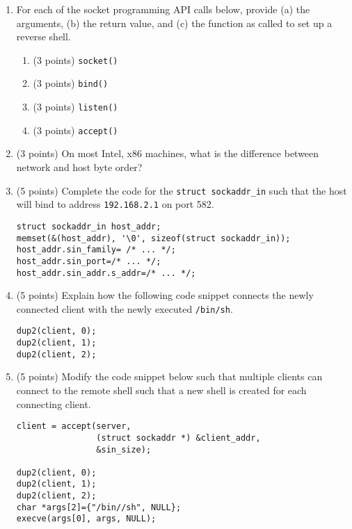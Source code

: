 \documentclass{article}[9pt]
\begin{document}
\begin{enumerate}
\item For each of the socket programming API calls below, provide (a)
the arguments, (b) the return value, and (c) the function as
called to set up a reverse shell.

\begin{enumerate}
\item (3 points) \texttt{socket()}

\item (3 points) \texttt{bind()}

\item (3 points) \texttt{listen()}

\item (3 points) \texttt{accept()}
\end{enumerate}

\item (3 points) On most Intel, x86 machines, what is the difference between network and host byte order?

\item (5 points) Complete the code for the \texttt{struct sockaddr\_in} such that the host
will bind to address \texttt{192.168.2.1} on port 582.

\begin{verbatim}
struct sockaddr_in host_addr;
memset(&(host_addr), '\0', sizeof(struct sockaddr_in));
host_addr.sin_family= /* ... */;
host_addr.sin_port=/* ... */;
host_addr.sin_addr.s_addr=/* ... */;
\end{verbatim}

\item (5 points) Explain how the following code snippet connects the newly
connected client with the newly executed \texttt{/bin/sh}.

\begin{verbatim}
dup2(client, 0);
dup2(client, 1);
dup2(client, 2); 
\end{verbatim}

\item (5 points) Modify the code snippet below such that multiple clients can
connect to the remote shell such that a new shell is created for
each connecting client.

\begin{verbatim}
client = accept(server,
                (struct sockaddr *) &client_addr,
                &sin_size);

dup2(client, 0);
dup2(client, 1);
dup2(client, 2);
char *args[2]={"/bin//sh", NULL};
execve(args[0], args, NULL);
\end{verbatim}


\end{enumerate}
\end{document}
